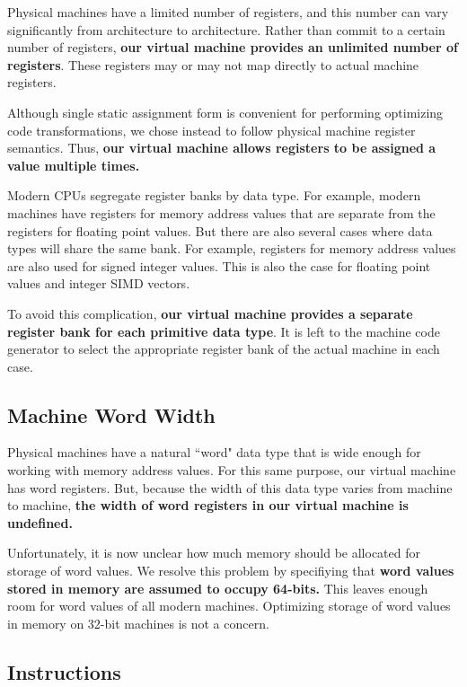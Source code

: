 Physical machines have a limited number of registers, and this number
can vary significantly from architecture to architecture.
Rather than commit to a certain number of registers, \textbf{our virtual
machine provides an unlimited number of registers}. These registers
may or may not map directly to actual machine registers.

Although single static assignment form is convenient for performing
optimizing code transformations, we chose instead to follow physical machine
register semantics. Thus, \textbf{our virtual machine allows
registers to be assigned a value multiple times.}

Modern CPUs segregate register banks by data type.
For example, modern machines have registers for memory address values
that are separate from the registers for floating point values.
But there are also several cases where data types will share the same bank.
For example, registers for memory address values are also used for signed integer
values. This is also the case for floating point values and integer SIMD vectors.

To avoid this complication,
\textbf{our virtual machine provides a separate register bank for
each primitive data type}.
It is left to the machine code generator to select the
appropriate register bank of the actual machine in each case.

\subsection{Machine Word Width}
\label{sec:word}

Physical machines have a natural ``word" data type that is wide enough
for working with memory address values. For this same purpose,
our virtual machine has word registers. But, because the width of this data type
varies from machine to machine, \textbf{the width of word registers in
our virtual machine is undefined.}

Unfortunately, it is now unclear how much
memory should be allocated for storage of word values.
We resolve this problem by specifiying that
\textbf{word values stored in memory are assumed to occupy 64-bits.}
This leaves enough room for word values of all modern machines.
Optimizing storage of word values in memory on 32-bit machines
is not a concern.

\subsection{Instructions}

